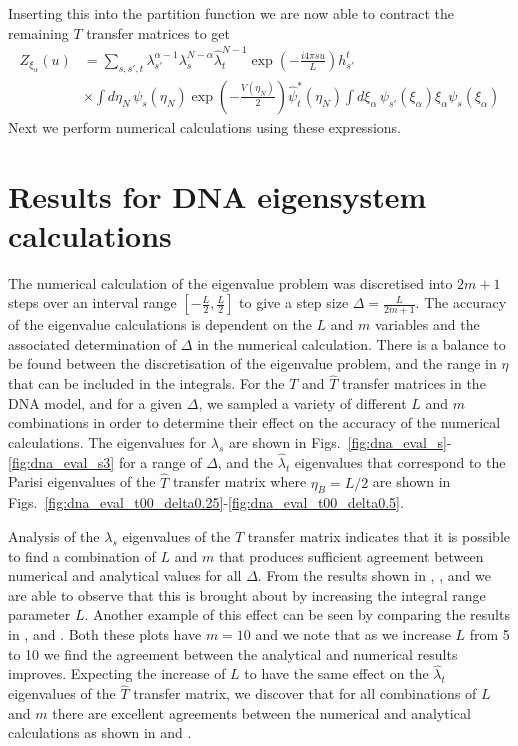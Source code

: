 %
Inserting this into the partition function we are now able to contract the remaining $T$ transfer matrices to get
%
\begin{align}
Z_{\xi_{\alpha}}\left(u\right)&=\sum_{s,s',t}\lambda_{s'}^{\alpha-1}\lambda_{s}^{N-\alpha}\hat{\lambda}_{t}^{N-1}\exp\left(-\frac{i4\pi s u}{L}\right)h^{t}_{s'}\nonumber\\
&\times\int d\eta_{N}\,\psi_{s}\left(\eta_{N}\right)\exp\left(-\frac{V\left(\eta_{N}\right)}{2}\right)\hat{\psi}^{*}_{t}\left(\eta_{N}\right)\int d\xi_{\alpha}\, \psi_{s'}\left(\xi_{\alpha}\right)\xi_{\alpha}\psi_{s}\left(\xi_{\alpha}\right)
\end{align}
%
Next we perform numerical calculations using these expressions.

\section{Results for DNA eigensystem calculations}

The numerical calculation of the eigenvalue problem was discretised into $2m+1$ steps over an interval range $\left[-\frac{L}{2},\frac{L}{2}\right]$ to give a step size $\Delta = \frac{L}{2m+1}$. The accuracy of the eigenvalue calculations is dependent on the $L$ and $m$ variables and the associated determination of $\Delta$ in the numerical calculation. There is a balance to be found between the discretisation of the eigenvalue problem, and the range in $\eta$ that can be included in the integrals. For the $T$ and $\hat{T}$ transfer matrices in the DNA model, and for a given $\Delta$, we sampled a variety of different $L$ and $m$ combinations in order to determine their effect on the accuracy of the numerical calculations. The eigenvalues for $\lambda_s$ are shown in Figs.~\ref{fig:dna_eval_s}-\ref{fig:dna_eval_s3} for a range of $\Delta$, and the $\hat{\lambda}_t$ eigenvalues that correspond to the Parisi eigenvalues of the $\hat{T}$ transfer matrix where $\eta_B =L/2$ are shown in Figs.~\ref{fig:dna_eval_t00_delta0.25}-\ref{fig:dna_eval_t00_delta0.5}.

Analysis of the $\lambda_s$ eigenvalues of the $T$ transfer matrix indicates that it is possible to find a combination of $L$ and $m$ that produces sufficient agreement between numerical and analytical values for all $\Delta$. From the results shown in , , and  we are able to observe that this is brought about by increasing the integral range parameter $L$. Another example of this effect can be seen by comparing the results in , and . Both these plots have $m=10$ and we note that as we increase $L$ from 5 to 10 we find the agreement between the analytical and numerical results improves. Expecting the increase of $L$ to have the same effect on the $\hat{\lambda}_t$ eigenvalues of the $\hat{T}$ transfer matrix, we discover that for all combinations of $L$ and $m$ there are excellent agreements between the numerical and analytical calculations as shown in  and . 

